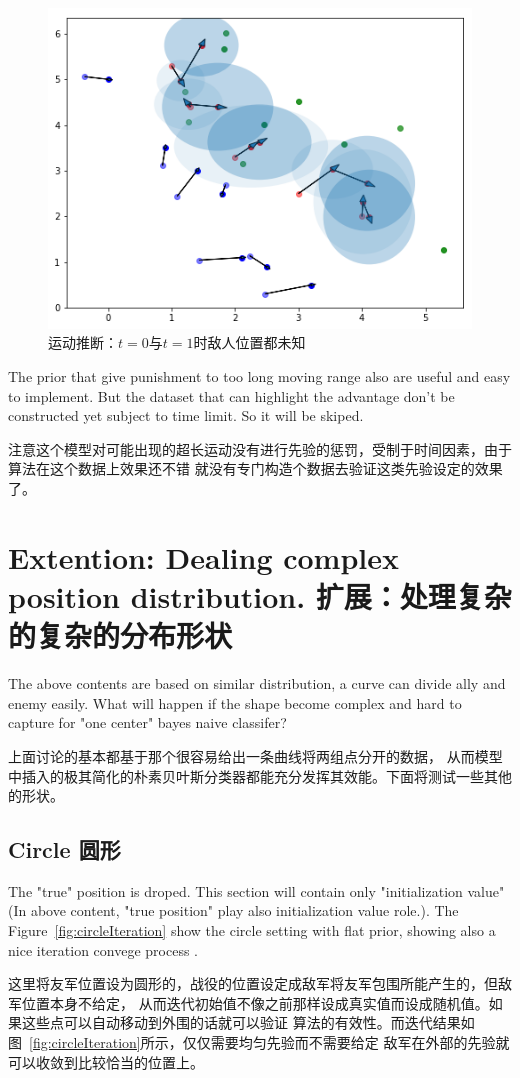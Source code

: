 \documentclass{article}
\begin{document}
\begin{figure}[ht]
\includegraphics[width=0.6\linewidth]{bueu.png}
\caption{运动推断：$t=0$与$t=1$时敌人位置都未知}
\label{fig:bueu}
\end{figure}

The prior that give punishment to too long moving range also are useful and easy to implement. 
But the dataset that can highlight the advantage don't be constructed yet subject to time limit.
So it will be skiped.

注意这个模型对可能出现的超长运动没有进行先验的惩罚，受制于时间因素，由于算法在这个数据上效果还不错
就没有专门构造个数据去验证这类先验设定的效果了。

\section{Extention: Dealing complex position distribution. 扩展：处理复杂的复杂的分布形状}

The above contents are based on similar distribution, a curve can divide ally and enemy easily.
What will happen if the shape become complex and hard to capture for "one center" bayes naive classifer?

上面讨论的基本都基于那个很容易给出一条曲线将两组点分开的数据，
从而模型中插入的极其简化的朴素贝叶斯分类器都能充分发挥其效能。下面将测试一些其他的形状。

\subsection{Circle 圆形}

The "true" position is droped. This section will contain only "initialization value"
(In above content, "true position" play also initialization value role.). 
The Figure~\ref{fig:circleIteration} show the circle setting with flat prior, 
showing also a nice iteration convege process .

这里将友军位置设为圆形的，战役的位置设定成敌军将友军包围所能产生的，但敌军位置本身不给定，
从而迭代初始值不像之前那样设成真实值而设成随机值。如果这些点可以自动移动到外围的话就可以验证
算法的有效性。而迭代结果如图~\ref{fig:circleIteration}所示，仅仅需要均匀先验而不需要给定
敌军在外部的先验就可以收敛到比较恰当的位置上。
\end{document}

